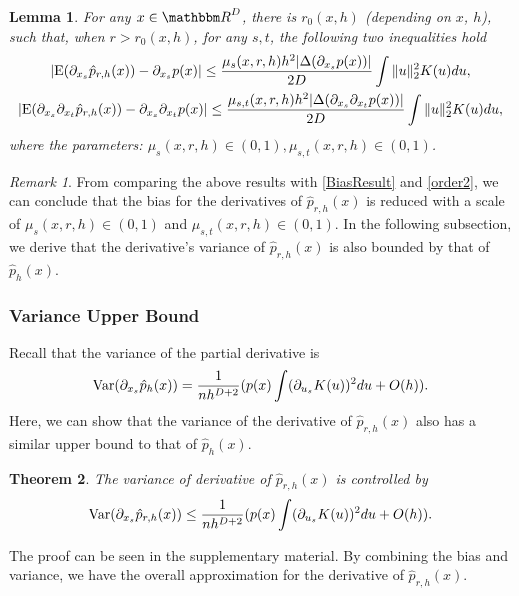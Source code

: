 \documentclass[aos,preprint]{imsart}
\newtheorem{theorem}{Theorem}[section]
\newtheorem{lemma}[theorem]{Lemma}
\theoremstyle{remark}
\newtheorem*{remark}{Remark}
\begin{document}
\begin{lemma}\label{bias_theorem}
For any $x\in {\mathbbm R}^D$, there is $r_0(x,h)$ (depending on $x$, $h$), such that, when $r> r_0(x,h)$,  for any $s, t$, the following two inequalities hold
\begin{gather*}
|{\rm E} (\partial_ {x_s} \hat{p}_{r,h}(x)) -\partial_{x_s} p(x)| \leq  \frac{ \mu_s(x,r,h)h^2 |\Delta (\partial_{x_s}p(x))|}{2D} \int \|u\|_2^2 K(u) du,\\
|{\rm E} (\partial_{x_s} \partial_{x_t}  \hat{p}_{r, h}(x))-  \partial_{x_s} \partial_{x_t} p(x)| \leq   \frac{\mu_{s,t}(x,r,h)h^2|\Delta (\partial_{x_s}\partial_{x_t}p(x))|}{2D}  \int \|u\|_2^2 K(u) du,
\end{gather*}
where the parameters: $\mu_s(x,r,h)\in(0,1), \mu_{s,t}(x,r,h)\in(0,1)$.
\end{lemma}
\begin{remark}
From comparing the above results with \eqref{BiasResult} and \eqref{order2}, we can conclude that the bias for the derivatives of $\hat{p}_{r,h}(x)$ is reduced with a scale of $\mu_s(x,r,h)\in(0,1)$ and $\mu_{s,t}(x,r,h)\in(0,1)$. In the following subsection, we derive that the derivative's variance of $\hat{p}_{r,h}(x)$ is also bounded by that of $\hat{p}_h(x)$. 
\end{remark}
\subsubsection{Variance Upper Bound}
Recall that the variance of the partial derivative is
\[
{{\rm Var}}(\partial_{x_s} \hat{p}_h(x)) = \frac{1}{n h^{D+2}}  (p(x) \int (\partial_{ u_s } K (u) )^2  du + O(h)).
\] 
Here, we can show that the variance of the derivative of $\hat{p}_{r,h}(x)$ also has a similar upper bound to that of $\hat{p}_{h}(x)$.
\begin{theorem}{The variance of derivative of $\hat{p}_{r,h}(x)$ is controlled by}
\[
{{\rm Var}}(\partial_{x_s} \hat{p}_{r,h}(x)) \leq \frac{1}{n h^{D+2}}  (p(x) \int (\partial_{ u_s } K (u) )^2   du + O(h)).
\]
\end{theorem}
The proof can be seen in the supplementary material.  %
By combining the bias and variance, we have the overall approximation for the derivative of $\hat{p}_{r,h}(x)$.
\end{document}
